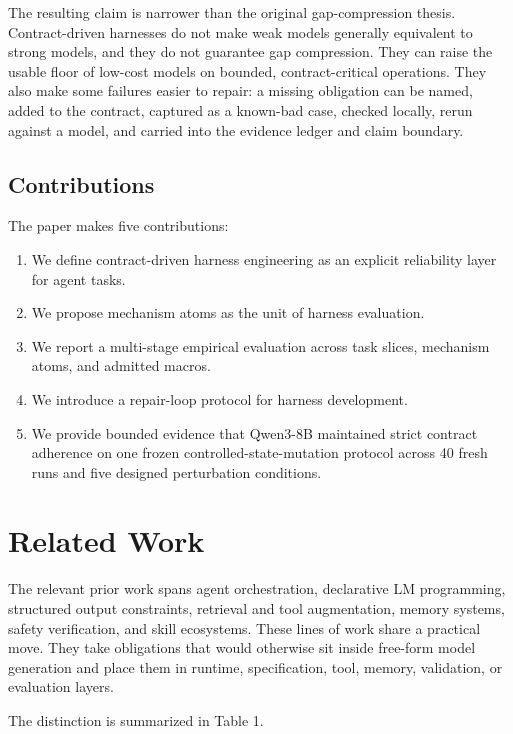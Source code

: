 \documentclass[11pt]{article}
\begin{document}
The resulting claim is narrower than the original gap-compression thesis. Contract-driven harnesses do not make weak models generally equivalent to strong models, and they do not guarantee gap compression. They can raise the usable floor of low-cost models on bounded, contract-critical operations. They also make some failures easier to repair: a missing obligation can be named, added to the contract, captured as a known-bad case, checked locally, rerun against a model, and carried into the evidence ledger and claim boundary.

\subsection{Contributions}

The paper makes five contributions:

\begin{enumerate}
\item We define contract-driven harness engineering as an explicit reliability layer for agent tasks.
\item We propose mechanism atoms as the unit of harness evaluation.
\item We report a multi-stage empirical evaluation across task slices, mechanism atoms, and admitted macros.
\item We introduce a repair-loop protocol for harness development.
\item We provide bounded evidence that Qwen3-8B maintained strict contract adherence on one frozen controlled-state-mutation protocol across 40 fresh runs and five designed perturbation conditions.
\end{enumerate}

\section{Related Work}

The relevant prior work spans agent orchestration, declarative LM programming, structured output constraints, retrieval and tool augmentation, memory systems, safety verification, and skill ecosystems. These lines of work share a practical move. They take obligations that would otherwise sit inside free-form model generation and place them in runtime, specification, tool, memory, validation, or evaluation layers.

The distinction is summarized in Table 1.
\end{document}
